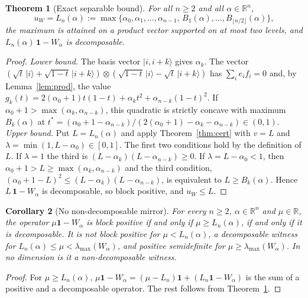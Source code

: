 \documentclass[10pt,a4paper]{article}
\newtheorem{theorem}{Theorem}
\newtheorem{corollary}[theorem]{Corollary}
\newcommand{\ket}[1]{\lvert #1\rangle}
\newcommand{\id}{\mathbf{1}}
\newcommand{\uW}{u_W}
\newcommand{\lmax}{\lambda_{\max}}
\begin{document}
\begin{theorem}[Exact separable bound]\label{thm:exact}
For all $n\ge2$ and all $\alpha\in\mathbb{R}^n$,
\begin{equation}\label{eq:L}
\uW=L_n(\alpha):=\max\bigl\{\alpha_0,\alpha_1,\dots,\alpha_{n-1},\,
B_1(\alpha),\dots,B_{\lfloor n/2\rfloor}(\alpha)\bigr\},
\end{equation}
the maximum is attained on a product vector supported on at most two levels, and
$L_n(\alpha)\,\id-W_\alpha$ is decomposable.
\end{theorem}
\begin{proof}
\emph{Lower bound.} The basis vector $\ket{i,i+k}$ gives $\alpha_k$. The vector
$(\sqrt t\,\ket i+\sqrt{1-t}\,\ket{i+k})\otimes(\sqrt{1-t}\,\ket i-\sqrt t\,\ket{i+k})$
has $\sum_ie_if_i=0$ and, by Lemma~\ref{lem:prod}, the value
$g_k(t)=2(\alpha_0+1)t(1-t)+\alpha_kt^{2}+\alpha_{n-k}(1-t)^{2}$. If
$\alpha_0+1>\max(\alpha_k,\alpha_{n-k})$, this quadratic is strictly concave with maximum
$B_k(\alpha)$ at
$t^{*}=(\alpha_0+1-\alpha_{n-k})/(2(\alpha_0+1)-\alpha_k-\alpha_{n-k})\in(0,1)$.
\emph{Upper bound.} Put $L=L_n(\alpha)$ and apply Theorem~\ref{thm:cert} with $v=L$ and
$\lambda=\min(1,L-\alpha_0)\in[0,1]$. The first two conditions hold by the definition of
$L$. If $\lambda=1$ the third is $(L-\alpha_k)(L-\alpha_{n-k})\ge0$. If
$\lambda=L-\alpha_0<1$, then $\alpha_0+1>L\ge\max(\alpha_k,\alpha_{n-k})$ and the third
condition, $(\alpha_0+1-L)^2\le(L-\alpha_k)(L-\alpha_{n-k})$, is equivalent to
$L\ge B_k(\alpha)$. Hence $L\,\id-W_\alpha$ is decomposable, so block positive, and
$\uW\le L$.
\end{proof}

\begin{corollary}[No non-decomposable mirror]\label{cor:nogo}
For every $n\ge2$, $\alpha\in\mathbb{R}^n$ and $\mu\in\mathbb{R}$, the operator
$\mu\id-W_\alpha$ is block positive if and only if $\mu\ge L_n(\alpha)$, if and only if it
is decomposable. It is not block positive for $\mu<L_n(\alpha)$, a decomposable witness
for $L_n(\alpha)\le\mu<\lmax(W_\alpha)$, and positive semidefinite for
$\mu\ge\lmax(W_\alpha)$. In no dimension is it a non-decomposable witness.
\end{corollary}
\begin{proof}
For $\mu\ge L_n(\alpha)$, $\mu\id-W_\alpha=(\mu-L_n)\id+(L_n\id-W_\alpha)$ is the sum of a
positive and a decomposable operator. The rest follows from Theorem~\ref{thm:exact}.
\end{proof}
\end{document}
